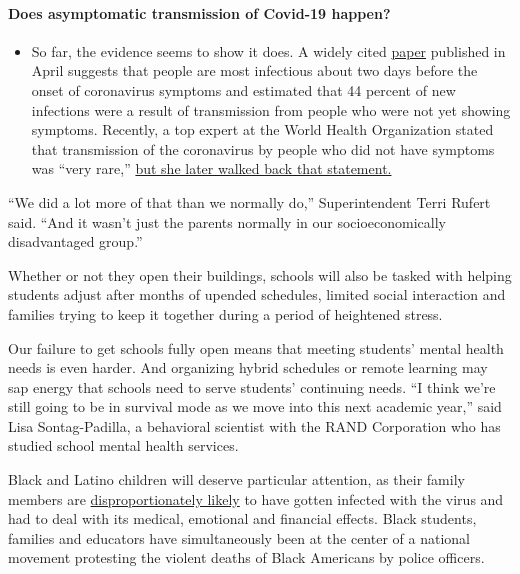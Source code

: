 \begin{itemize}
{  \paragraph{Does asymptomatic transmission of Covid-19
  happen?}\label{does-asymptomatic-transmission-of-covid-19-happen}}

  \begin{itemize}
  \tightlist
  \item
    So far, the evidence seems to show it does. A widely cited
    \href{https://www.nature.com/articles/s41591-020-0869-5}{paper}
    published in April suggests that people are most infectious about
    two days before the onset of coronavirus symptoms and estimated that
    44 percent of new infections were a result of transmission from
    people who were not yet showing symptoms. Recently, a top expert at
    the World Health Organization stated that transmission of the
    coronavirus by people who did not have symptoms was ``very rare,''
    \href{https://www.nytimes3xbfgragh.onion/2020/06/09/world/coronavirus-updates.html?action=click\&pgtype=Article\&state=default\&region=MAIN_CONTENT_3\&context=storylines_faq\#link-1f302e21}{but
    she later walked back that statement.}
  \end{itemize}
\end{itemize}

``We did a lot more of that than we normally do,'' Superintendent Terri
Rufert said. ``And it wasn't just the parents normally in our
socioeconomically disadvantaged group.''

Whether or not they open their buildings, schools will also be tasked
with helping students adjust after months of upended schedules, limited
social interaction and families trying to keep it together during a
period of heightened stress.

Our failure to get schools fully open means that meeting students'
mental health needs is even harder. And organizing hybrid schedules or
remote learning may sap energy that schools need to serve students'
continuing needs. ``I think we're still going to be in survival mode as
we move into this next academic year,'' said Lisa Sontag-Padilla, a
behavioral scientist with the RAND Corporation who has studied school
mental health services.

Black and Latino children will deserve particular attention, as their
family members are
\href{https://www.nytimes3xbfgragh.onion/interactive/2020/07/05/us/coronavirus-latinos-african-americans-cdc-data.html}{disproportionately
likely} to have gotten infected with the virus and had to deal with its
medical, emotional and financial effects. Black students, families and
educators have simultaneously been at the center of a national movement
protesting the violent deaths of Black Americans by police officers.

